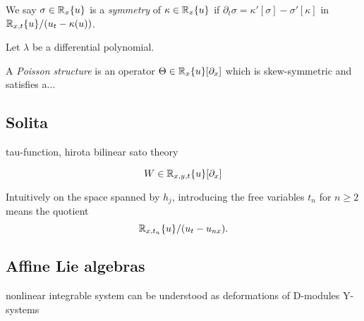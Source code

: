 \documentclass{../../../small}
\begin{document}
\begin{prb}[Symmetry]
We say $\sigma\in\mathbb{R}_x\{u\}$ is a \emph{symmetry} of $\kappa\in\mathbb{R}_x\{u\}$ if $\partial_t\sigma=\kappa'[\sigma]-\sigma'[\kappa]$ in $\mathbb{R}_{x,t}\{u\}/(u_t-\kappa(u))$.
\end{prb}

\begin{prb}[Lagrangian]
Let $\lambda$ be a differential polynomial.
\end{prb}


\begin{prb}
A \emph{Poisson structure} is an operator $\Theta\in\mathbb{R}_x\{u\}[\partial_x]$ which is skew-symmetric and satisfies a...
\end{prb}


\subsection*{Solita}

tau-function, hirota bilinear
sato theory

\[W\in\mathbb{R}_{x,y,t}\{u\}[\partial_x]\]

Intuitively on the space spanned by $h_j$, introducing the free variables $t_n$ for $n\ge2$ means the quotient
\[\mathbb{R}_{x,t_n}\{u\}/(u_t-u_{nx}).\]



\subsection*{Affine Lie algebras}

nonlinear integrable system can be understood as deformations of D-modules
Y-systems
\end{document}
